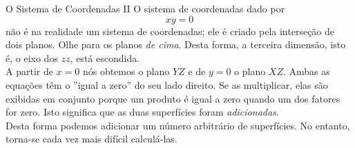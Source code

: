\begin{surferPage}[As Coordenadas II]{O Sistema de Coordenadas II}
O sistema de coordenadas dado por
\[xy=0\]
n\~ao \'e na realidade um sistema de coordenadas; ele \'e criado pela interse\c c\~ao de dois planos. Olhe para os planos {\it de cima}. Desta forma, a terceira dimens\~ao, isto \'e, o eixo dos $zz$, est\'a escondida. \\
\vspace{0.3cm}
A partir de $x=0$ n\'os obtemos o plano $YZ$ e de  $y=0$ o plano $XZ$.
Ambas as equa\c c\~oes t\^em o ''igual a zero'' do seu lado direito. Se as multiplicar, elas s\~ao exibidas em conjunto porque um produto \'e igual a zero quando um dos fatores for zero. Isto significa que as duas superf\'icies foram {\it adicionadas}. \\
Desta forma podemos adicionar um n\'umero arbitr\'ario de superf\'icies. No entanto, torna-se cada vez mais dif\'icil calcul\'a-las.
\end{surferPage}
